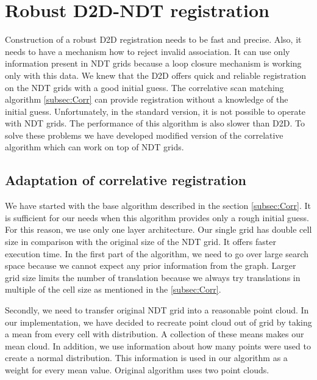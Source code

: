 \section{Robust D2D-NDT registration}
\label{sec:Robust D2D-NDT}
Construction of a robust \gls{D2D} registration needs to be fast and precise. Also, it needs to have a mechanism how to reject invalid association. It can use only information present in \gls{NDT} grids because a loop closure mechanism is working only with this data. We knew that the \gls{D2D} offers quick and reliable registration on the \gls{NDT} grids with a good initial guess. The correlative scan matching algorithm  \ref{subsec:Corr} can provide registration without a knowledge of the initial guess. Unfortunately, in the standard version, it is not possible to operate with \gls{NDT} grids. The performance of this algorithm is also slower than \gls{D2D}. To solve these problems we have developed modified version of the correlative algorithm which can work on top of \gls{NDT} grids.

\subsection{Adaptation of correlative registration}
We have started with the base algorithm described in the section \ref{subsec:Corr}. It is sufficient for our needs when this algorithm provides only a rough initial guess. For this reason, we use only one layer architecture. Our single grid has double cell size in comparison with the original size of the \gls{NDT} grid. It offers faster execution time. In the first part of the algorithm, we need to go over large search space because we cannot expect any prior information from the graph. Larger grid size limits the number of translation because we always try translations in multiple of the cell size as mentioned in the \ref{subsec:Corr}. 

Secondly, we need to transfer original \gls{NDT} grid into a reasonable point cloud. In our implementation, we have decided to recreate point cloud out of grid by taking a mean from every cell with distribution. A collection of these means makes our mean cloud. In addition, we use information about how many points were used to create a normal distribution. This information is used in our algorithm as a weight for every mean value. Original algorithm uses two point clouds. 

